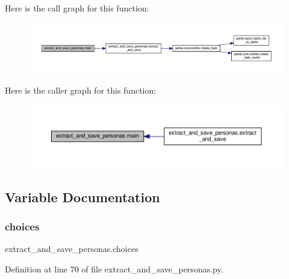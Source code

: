 Here is the call graph for this function\+:
\nopagebreak
\begin{figure}[H]
\begin{center}
\leavevmode
\includegraphics[width=350pt]{namespaceextract__and__save__personas_abb9b78f74e9baf9fa763bff3c1b99381_cgraph}
\end{center}
\end{figure}
Here is the caller graph for this function\+:
\nopagebreak
\begin{figure}[H]
\begin{center}
\leavevmode
\includegraphics[width=350pt]{namespaceextract__and__save__personas_abb9b78f74e9baf9fa763bff3c1b99381_icgraph}
\end{center}
\end{figure}


\subsection{Variable Documentation}
\mbox{\label{namespaceextract__and__save__personas_ae72c36d50a42709ff5063eafd8f893e3}} 
\subsubsection{\texorpdfstring{choices}{choices}}
{\footnotesize\ttfamily extract\+\_\+and\+\_\+save\+\_\+personas.\+choices}



Definition at line 70 of file extract\+\_\+and\+\_\+save\+\_\+personas.\+py.

\mbox{\label{namespaceextract__and__save__personas_a475e9f30a72263f9f48fe2ba3aa9d8d4}} 
